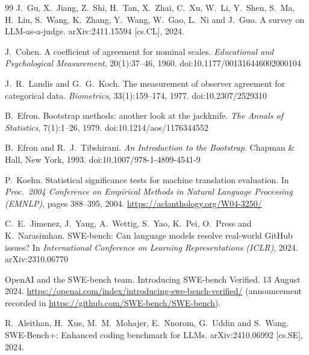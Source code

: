 \documentclass[11pt,a4paper]{article}
\begin{document}
\begin{thebibliography}{99}
J.~Gu, X.~Jiang, Z.~Shi, H.~Tan, X.~Zhai, C.~Xu, W.~Li, Y.~Shen, S.~Ma,
H.~Liu, S.~Wang, K.~Zhang, Y.~Wang, W.~Gao, L.~Ni and J.~Guo.
\newblock A survey on LLM-as-a-judge.
\newblock arXiv:2411.15594 [cs.CL], 2024.

J.~Cohen.
\newblock A coefficient of agreement for nominal scales.
\newblock \emph{Educational and Psychological Measurement}, 20(1):37--46,
1960.
\newblock doi:10.1177/001316446002000104

J.~R.~Landis and G.~G.~Koch.
\newblock The measurement of observer agreement for categorical data.
\newblock \emph{Biometrics}, 33(1):159--174, 1977.
\newblock doi:10.2307/2529310

B.~Efron.
\newblock Bootstrap methods: another look at the jackknife.
\newblock \emph{The Annals of Statistics}, 7(1):1--26, 1979.
\newblock doi:10.1214/aos/1176344552

B.~Efron and R.~J.~Tibshirani.
\newblock \emph{An Introduction to the Bootstrap}.
\newblock Chapman \& Hall, New York, 1993.
\newblock doi:10.1007/978-1-4899-4541-9

P.~Koehn.
\newblock Statistical significance tests for machine translation
evaluation.
\newblock In \emph{Proc.\ 2004 Conference on Empirical Methods in Natural
Language Processing (EMNLP)}, pages 388--395, 2004.
\newblock \url{https://aclanthology.org/W04-3250/}

C.~E.~Jimenez, J.~Yang, A.~Wettig, S.~Yao, K.~Pei, O.~Press and
K.~Narasimhan.
\newblock SWE-bench: Can language models resolve real-world GitHub issues?
\newblock In \emph{International Conference on Learning Representations
(ICLR)}, 2024.
\newblock arXiv:2310.06770

OpenAI and the SWE-bench team.
\newblock Introducing SWE-bench Verified. 13 August 2024.
\newblock \url{https://openai.com/index/introducing-swe-bench-verified/}
(announcement recorded in \url{https://github.com/SWE-bench/SWE-bench}).

R.~Aleithan, H.~Xue, M.~M.~Mohajer, E.~Nnorom, G.~Uddin and S.~Wang.
\newblock SWE-Bench+: Enhanced coding benchmark for LLMs.
\newblock arXiv:2410.06992 [cs.SE], 2024.


\end{thebibliography}
\end{document}
